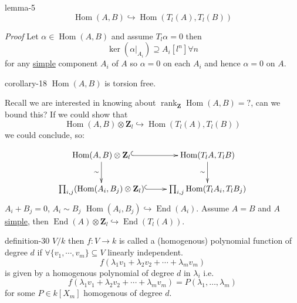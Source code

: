 \documentclass[10pt,]{book}
\makeatletter
\renewcommand*{\proofname}{Proof}
\renewenvironment{proof}[1][\proofname]{\par
  \pushQED{\qed}%
  \normalfont \topsep6\p@\@plus6\p@\relax
  \trivlist
  \item\relax
    {\itshape
    #1\@addpunct{.}}\hspace\labelsep\ignorespaces
}{%
  \popQED\endtrivlist\@endpefalse
}
\numberwithin{equation}{section}
\newcommand{\lb}{[}
\newcommand{\rb}{]}
\newcommand{\ZZ}{\mathbf{Z}}
\DeclareMathOperator{\End}{End}
\DeclareMathOperator{\Hom}{Hom}
\DeclareMathOperator{\rank}{rank}
\makeatother
\begin{document}
%
\begin{lemma}{}{}{lemma-5}%
\hypertarget{p-229}{}%
%
\begin{equation*}
\Hom(A,B) \hookrightarrow \Hom(T_l(A), T_l(B))
\end{equation*}
%
\end{lemma}
\begin{proof}\hypertarget{proof-43}{}
\hypertarget{p-230}{}%
Let \(\alpha \in \Hom(A,B)\) and assume \(T_l \alpha = 0\) then%
\begin{equation*}
\ker (\alpha|_{A_i}) \supseteq A_i[l^n] \forall n
\end{equation*}
for any \hyperref[def-simple-av]{simple} component \(A_i\) of \(A\) so \(\alpha =0\) on each \(A_i\) and hence \(\alpha = 0\) on \(A\).%
\end{proof}
\begin{corollary}{}{}{corollary-18}%
\hypertarget{p-231}{}%
\(\Hom(A,B)\) is torsion free.%
\end{corollary}
\hypertarget{p-232}{}%
Recall we are interested in knowing about \(\rank_\ZZ\Hom(A,B) = ?\), can we bound this? If we could show that%
\begin{equation*}
\Hom(A,B) \otimes \ZZ_l \hookrightarrow \Hom(T_l(A),T_l(B))
\end{equation*}
we could conclude, so:%
\par
\hypertarget{p-233}{}%
%
\begin{equation*}
\xymatrix{
\Hom(A,B)\otimes \ZZ_l \ar[d]_{\sim} \ar@{^(->}[r]     & \Hom(T_lA,T_lB)\ar[d]_{\sim} \\
\prod_{i,j} (\Hom(A_i, B_j) \otimes \ZZ_l) \ar@{^(->}[r] & \prod_{i,j}\Hom(T_lA_i, T_l B_j)
}
\end{equation*}
\(A_i + B_j = 0\), \(A_i\sim B_j\) \(\Hom(A_i, B_j) \hookrightarrow \End(A_i)\). Assume \(A= B\) and \(A\) \hyperref[def-simple-av]{simple}, then \(\End(A) \otimes \ZZ_l \hookrightarrow \End(T_l(A))\).%
\begin{definition}{}{definition-30}%
\hypertarget{p-234}{}%
\(V/k\) then \(f\colon V \to k\) is called a (homogenous) polynomial function of degree \(d\) if \(\forall \{v_1,\cdots, v_m\}\subseteq V\) linearly independent.%
\begin{equation*}
f(\lambda_1 v_1 + \lambda_2 v_2 +\cdots + \lambda_m v_m)
\end{equation*}
is given by a homogenous polynomial of degree \(d\) in \(\lambda_i\) i.e.%
\begin{equation*}
f(\lambda_1 v_1 + \lambda_2 v_2 +\cdots + \lambda_m v_m) = P(\lambda_1,\ldots, \lambda_m)
\end{equation*}
for some \(P\in k\lb X_m\rb\) homogenous of degree \(d\).%
\end{definition}
\end{document}
